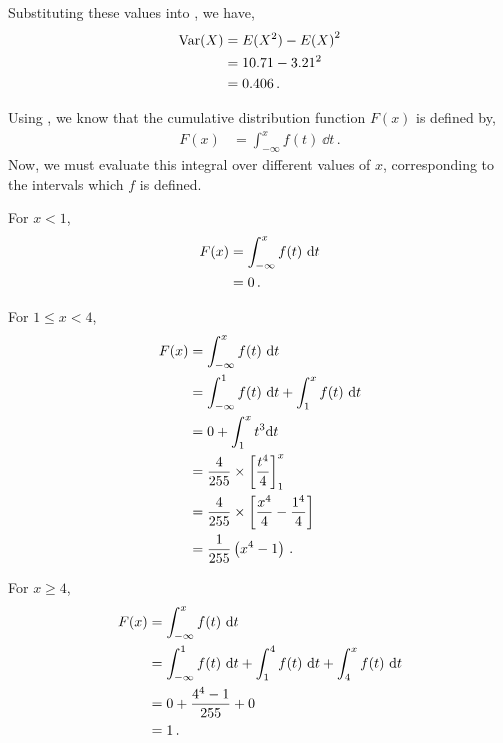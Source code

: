 \begin{subquestions}
\begin{subsubquestions}
Substituting these values into , we have,
\begin{align}
\text{Var}(X) & = E(X^2) - {E(X)}^2 \nonumber \\
	& = 10.71 - 3.21^2 \nonumber \\
	& = 0.406 \,.	
\end{align}

\end{subsubquestions}
	

\subquestion

\begin{subsubquestions}
	
\subsubquestion
Using , we know that the cumulative distribution function $F(x)$ is defined by,
\begin{align}
F(x) &= \int_{-\infty}^{x} f(t) ~\dd{t} \,.
\end{align}
Now, we must evaluate this integral over different values of $x$, corresponding to the intervals which $f$ is defined.

For $x<1$, 
\begin{align}
F(x) &=  \int_{-\infty}^{x} f(t) ~\mathrm{d}{t} \nonumber \\
&= 0 \,.
\end{align}

For $1 \leq x < 4$,
\begin{align}
F(x) &=  \int_{-\infty}^{x} f(t) ~\mathrm{d}{t} \nonumber \\
      &=  \int_{-\infty}^{1} f(t) ~\mathrm{d}{t} +  \int_{1}^{x} f(t) ~\mathrm{d}{t} \nonumber \\ 
      &= 0 + \int_1^x t^3 \mathrm{d} t \\
      & = \frac{4}{255} \times \left[\frac{t^4}{4}\right]^x_1 \nonumber \\
      & = \frac{4}{255} \times \left[\frac{x^4}{4} - \frac{1^4}{4} \right] \nonumber \\
      & = \frac{1}{255}\left(x^4 - 1 \right) \,.
\end{align}

For $x \geq 4$,
\begin{align}
F(x) &=  \int_{-\infty}^{x} f(t) ~\mathrm{d}{t} \nonumber \\
      &= \int_{-\infty}^{1} f(t) ~\mathrm{d}{t} + \int_{1}^{4} f(t) ~\mathrm{d}{t} + \int_{4}^{x} f(t) ~\mathrm{d}{t} \nonumber \\
      &= 0 + \frac{4^4-1}{255} + 0 \nonumber \\
      &= 1 \,.
\end{align}


\end{subsubquestions}
\end{subquestions}
